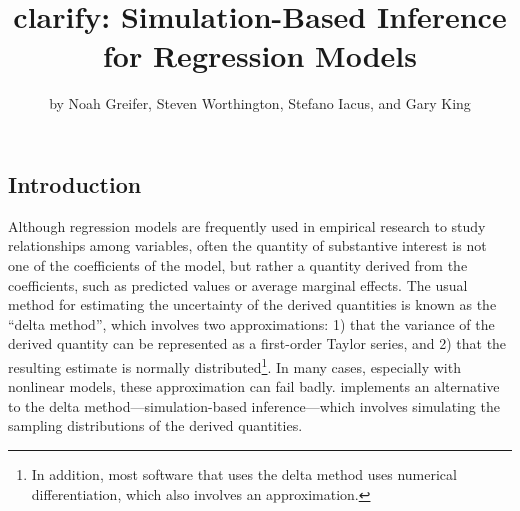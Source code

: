 \title{clarify: Simulation-Based Inference for Regression Models}


\author{by Noah Greifer, Steven Worthington, Stefano Iacus, and Gary King}

\maketitle


\hypertarget{introduction}{%
\subsection{Introduction}\label{introduction}}

Although regression models are frequently used in empirical research to study relationships among variables, often the quantity of substantive interest is not one of the coefficients of the model, but rather a quantity derived from the coefficients, such as predicted values or average marginal effects. The usual method for estimating the uncertainty of the derived quantities is known as the ``delta method'', which involves two approximations: 1) that the variance of the derived quantity can be represented as a first-order Taylor series, and 2) that the resulting estimate is normally distributed\footnote{In addition, most software that uses the delta method uses numerical differentiation, which also involves an approximation.}. In many cases, especially with nonlinear models, these approximation can fail badly.  implements an alternative to the delta method---simulation-based inference---which involves simulating the sampling distributions of the derived quantities.

